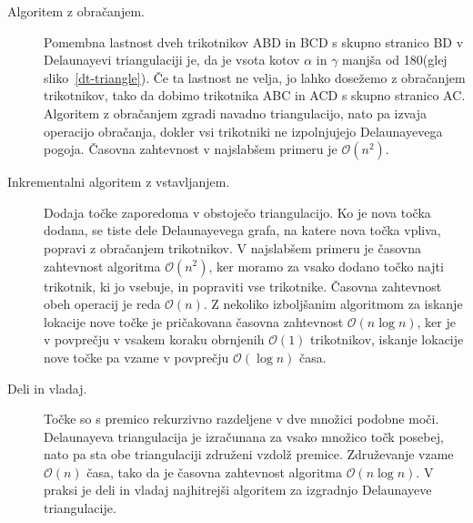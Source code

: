 \documentclass[a4paper, 12pt]{book}
\newcommand{\OO}{\ensuremath{\mathcal{O}}} %
\begin{document}
\begin{description}
\item[Algoritem z obračanjem.] Pomembna lastnost dveh trikotnikov ABD in BCD s skupno stranico BD v Delaunayevi triangulaciji je, da je vsota kotov $\alpha$ in $\gamma$ manjša od 180\textdegree (glej sliko~\ref{dt-triangle}). Če ta lastnost ne velja, jo lahko dosežemo z obračanjem trikotnikov, tako da dobimo trikotnika ABC in ACD s skupno stranico AC. Algoritem z obračanjem zgradi navadno triangulacijo, nato pa izvaja operacijo obračanja, dokler vsi trikotniki ne izpolnjujejo Delaunayevega pogoja. Časovna zahtevnost v najslabšem primeru je $\OO(n^2)$.
\item[Inkrementalni algoritem z vstavljanjem.] Dodaja točke zaporedoma v obstoječo triangulacijo. Ko je nova točka dodana, se tiste dele Delaunayevega grafa, na katere nova točka vpliva, popravi z obračanjem trikotnikov. V najslabšem primeru je časovna zahtevnost algoritma $\OO(n^2)$, ker moramo za vsako dodano točko najti trikotnik, ki jo vsebuje, in popraviti vse trikotnike. Časovna zahtevnost obeh operacij je reda $\OO(n)$. Z nekoliko izboljšanim algoritmom za iskanje lokacije nove točke je pričakovana časovna zahtevnost $\OO(n\log n)$, ker je v povprečju v vsakem koraku obrnjenih $\OO(1)$ trikotnikov, iskanje lokacije nove točke pa vzame v povprečju $\OO(\log n)$ časa.
\item[Deli in vladaj.] Točke so s premico rekurzivno razdeljene v dve množici podobne moči. Delaunayeva triangulacija je izračunana za vsako množico točk posebej, nato pa sta obe triangulaciji združeni vzdolž premice. Združevanje vzame $\OO(n)$ časa, tako da je časovna zahtevnost algoritma $\OO(n\log n)$. V praksi je deli in vladaj najhitrejši algoritem za izgradnjo Delaunayeve triangulacije.
\end{description}
\end{document}
